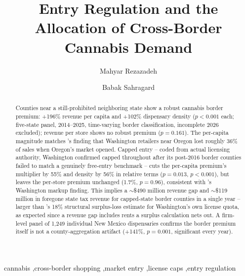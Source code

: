 \documentclass[5p]{elsarticle}
\begin{document}
\begin{frontmatter}

\title{Entry Regulation and the Allocation of Cross-Border Cannabis Demand}

\author[1]{Mahyar Rezazadeh}
\author[1]{Babak Sahragard}
\address[1]{Department of Economics}

\begin{abstract}
Counties near a still-prohibited neighboring state show a robust cannabis border premium: +196\% revenue per
capita and +102\% dispensary density ($p<0.001$ each; five-state panel, 2014--2025, time-varying border
classification, incomplete 2026 excluded); revenue per store shows no robust premium ($p{=}0.161$). The
per-capita magnitude matches \citet{HansenMillerWeber2020}'s finding that Washington retailers near Oregon
lost roughly 36\% of sales when Oregon's market opened. Capped entry -- coded from actual licensing authority,
Washington confirmed capped throughout after its post-2016 border counties failed to match a genuinely
free-entry benchmark -- cuts the per-capita premium's multiplier by 55\% and density by 56\% in relative terms
($p{=}0.013$, $p{<}0.001$), but leaves the per-store premium unchanged (1.7\%, $p{=}0.96$), consistent with
\citet{HollenbeckUetake2021}'s Washington markup finding. This implies a $\sim$\$490 million revenue gap and
$\sim$\$119 million in foregone state tax revenue for capped-state border counties in a single year -- larger
than \citet{Thomas2019LicenseQuotas}'s 18\% structural surplus-loss estimate for Washington's own license
quota, as expected since a revenue gap includes rents a surplus calculation nets out. A firm-level panel of
1{,}249 individual New Mexico dispensaries confirms the border premium itself is not a county-aggregation
artifact (+141\%, $p{=}0.001$, significant every year).
\end{abstract}

\begin{keyword}
cannabis \sep cross-border shopping \sep market entry \sep license caps \sep entry regulation
\end{keyword}

\end{frontmatter}
\end{document}
